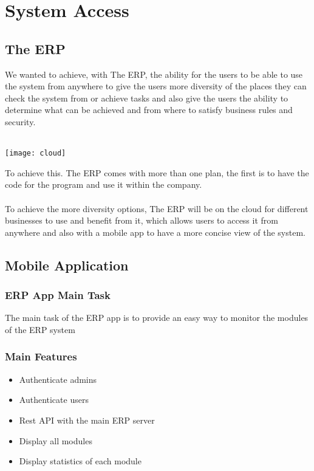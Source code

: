 \chapter{System Access}

\section{The ERP}
We wanted to achieve, with The ERP, the ability for the users to be able to use the system from
anywhere to give the users more diversity of the places they can check the system from or achieve
tasks and also give the users the ability to determine what can be achieved and from where to satisfy
business rules and security.\\\\

\begin{center}
    \texttt{[image: cloud]}
\end{center}

To achieve this. The ERP comes with more than one plan, the first is to have the code for the program
and use it within the company.\\\\
To achieve the more diversity options, The ERP will be on the cloud for different businesses to use
and benefit from it, which allows users to access it from anywhere and also with a mobile app to have
a more concise view of the system.

\section{Mobile Application}
\subsection{ERP App Main Task}
The main task of the ERP app is to provide an easy way to monitor the modules of the ERP system
\subsection{Main Features}
\begin{itemize}
    \item Authenticate admins
    \item Authenticate users
    \item Rest API with the main ERP server
    \item Display all modules
    \item Display statistics of each module
\end{itemize}

